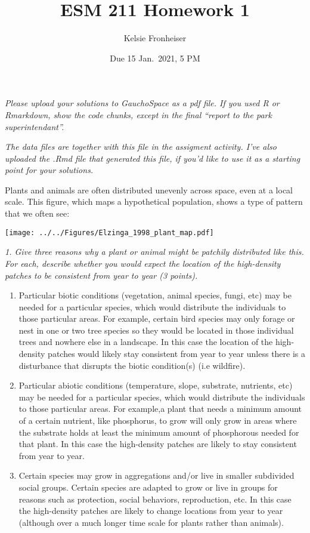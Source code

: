 \documentclass[
]{article}
\title{ESM 211 Homework 1}
\author{Kelsie Fronheiser}
\date{Due 15 Jan.~2021, 5 PM}
\begin{document}
\maketitle

\emph{Please upload your solutions to GauchoSpace as a pdf file. If you
used R or Rmarkdown, show the code chunks, except in the final ``report
to the park superintendant''.}

\emph{The data files are together with this file in the assigment
activity. I've also uploaded the .Rmd file that generated this file, if
you'd like to use it as a starting point for your solutions.}

Plants and animals are often distributed unevenly across space, even at
a local scale. This figure, which maps a hypothetical population, shows
a type of pattern that we often see:

\texttt{[image: ../../Figures/Elzinga\_1998\_plant\_map.pdf]}

\emph{1. Give three reasons why a plant or animal might be patchily
distributed like this. For each, describe whether you would expect the
location of the high-density patches to be consistent from year to year
(3 points).}

\begin{enumerate}
\def\labelenumi{\arabic{enumi}.}
\item
  Particular biotic conditions (vegetation, animal species, fungi, etc)
  may be needed for a particular species, which would distribute the
  individuals to those particular areas. For example, certain bird
  species may only forage or nest in one or two tree species so they
  would be located in those individual trees and nowhere else in a
  landscape. In this case the location of the high-density patches would
  likely stay consistent from year to year unless there is a disturbance
  that disrupts the biotic condition(s) (i.e wildfire).
\item
  Particular abiotic conditions (temperature, slope, substrate,
  nutrients, etc) may be needed for a particular species, which would
  distribute the individuals to those particular areas. For example,a
  plant that needs a minimum amount of a certain nutrient, like
  phosphorus, to grow will only grow in areas where the substrate holds
  at least the minimum amount of phosphorous needed for that plant. In
  this case the high-density patches are likely to stay consistent from
  year to year.
\item
  Certain species may grow in aggregations and/or live in smaller
  subdivided social groups. Certain species are adapted to grow or live
  in groups for reasons such as protection, social behaviors,
  reproduction, etc. In this case the high-density patches are likely to
  change locations from year to year (although over a much longer time
  scale for plants rather than animals).
\end{enumerate}
\end{document}
